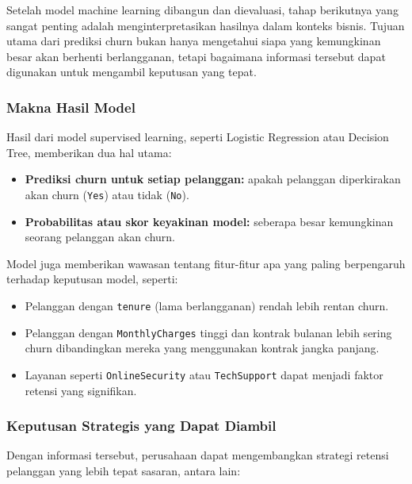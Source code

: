 Setelah model machine learning dibangun dan dievaluasi, tahap berikutnya yang sangat penting adalah menginterpretasikan hasilnya dalam konteks bisnis. Tujuan utama dari prediksi churn bukan hanya mengetahui siapa yang kemungkinan besar akan berhenti berlangganan, tetapi bagaimana informasi tersebut dapat digunakan untuk mengambil keputusan yang tepat.

\subsubsection*{Makna Hasil Model}

Hasil dari model supervised learning, seperti Logistic Regression atau Decision Tree, memberikan dua hal utama:
\begin{itemize}
	\item \textbf{Prediksi churn untuk setiap pelanggan:} apakah pelanggan diperkirakan akan churn (\texttt{Yes}) atau tidak (\texttt{No}).
	\item \textbf{Probabilitas atau skor keyakinan model:} seberapa besar kemungkinan seorang pelanggan akan churn.
\end{itemize}

Model juga memberikan wawasan tentang fitur-fitur apa yang paling berpengaruh terhadap keputusan model, seperti:
\begin{itemize}
	\item Pelanggan dengan \texttt{tenure} (lama berlangganan) rendah lebih rentan churn.
	\item Pelanggan dengan \texttt{MonthlyCharges} tinggi dan kontrak bulanan lebih sering churn dibandingkan mereka yang menggunakan kontrak jangka panjang.
	\item Layanan seperti \texttt{OnlineSecurity} atau \texttt{TechSupport} dapat menjadi faktor retensi yang signifikan.
\end{itemize}

\subsubsection*{Keputusan Strategis yang Dapat Diambil}

Dengan informasi tersebut, perusahaan dapat mengembangkan strategi retensi pelanggan yang lebih tepat sasaran, antara lain:

